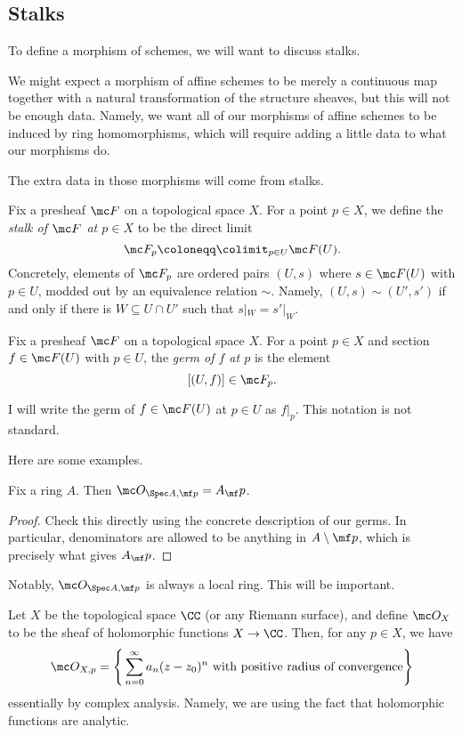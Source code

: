 \documentclass[../notes.tex]{subfiles}
\begin{document}
\subsection{Stalks}
To define a morphism of schemes, we will want to discuss stalks.
\begin{remark}
	We might expect a morphism of affine schemes to be merely a continuous map together with a natural transformation of the structure sheaves, but this will not be enough data. Namely, we want all of our morphisms of affine schemes to be induced by ring homomorphisms, which will require adding a little data to what our morphisms do.
\end{remark}
The extra data in those morphisms will come from stalks.
\begin{definition}[Stalk]
	Fix a presheaf $\mc F$ on a topological space $X$. For a point $p\in X$, we define the \textit{stalk of $\mc F$ at $p\in X$} to be the direct limit
	\[\mc F_p\coloneqq\colimit_{p\in U}\mc F(U).\]
	Concretely, elements of $\mc F_p$ are ordered pairs $(U,s)$ where $s\in\mc F(U)$ with $p\in U$, modded out by an equivalence relation $\sim$. Namely, $(U,s)\sim(U',s')$ if and only if there is $W\subseteq U\cap U'$ such that $s|_W=s'|_W$.
\end{definition}
\begin{definition}[Germ]
	Fix a presheaf $\mc F$ on a topological space $X$. For a point $p\in X$ and section $f\in\mc F(U)$ with $p\in U$, the \textit{germ of $f$ at $p$} is the element
	\[[(U,f)]\in\mc F_p.\]
\end{definition}
\begin{notation}
	I will write the germ of $f\in\mc F(U)$ at $p\in U$ as $f|_p$. This notation is not standard.
\end{notation}
Here are some examples.
\begin{lemma}
	Fix a ring $A$. Then $\mc O_{\Spec A,\mf p}=A_\mf p$.
\end{lemma}
\begin{proof}
	Check this directly using the concrete description of our germs. In particular, denominators are allowed to be anything in $A\setminus\mf p$, which is precisely what gives $A_\mf p$.
\end{proof}
Notably, $\mc O_{\Spec A,\mf p}$ is always a local ring. This will be important.
\begin{example}
	Let $X$ be the topological space $\CC$ (or any Riemann surface), and define $\mc O_X$ to be the sheaf of holomorphic functions $X\to\CC$. Then, for any $p\in X$, we have
	\[\mc O_{X,p}=\Bigg\{\sum_{n=0}^\infty a_n(z-z_0)^n\text{ with positive radius of convergence}\Bigg\}\]
	essentially by complex analysis. Namely, we are using the fact that holomorphic functions are analytic.
\end{example}
\end{document}
